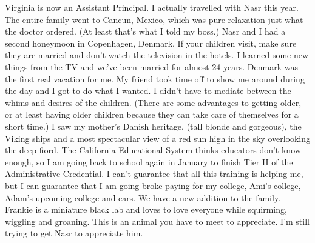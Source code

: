 Virginia is now an Assistant Principal. I actually travelled with Nasr this year. The entire family went to Cancun, Mexico, which was pure
relaxation-just what the doctor ordered.  (At least that's what I told my boss.)  Nasr and I had a second honeymoon in Copenhagen, Denmark.  If
your children visit, make sure they are married and don't watch the television in the hotels.  I learned some new things from the TV and we've
been married for almost 24 years.  Denmark was the first real vacation for me.  My friend took time off to show me around during the day and I
got to do what I wanted.  I didn't have to mediate between the whims and desires of the children.  (There are some advantages to getting older,
or at least having older children because they can take care of themselves for a short time.)  I saw my mother's Danish heritage, (tall blonde
and gorgeous), the Viking ships and a most spectacular view of a red sun high in the sky overlooking the deep fiord.  The California Educational
System thinks educators don't know enough, so I am going back to school again in January to finish Tier II of the Administrative Credential.  I
can't guarantee that all this training is helping me, but I can guarantee that I am going broke paying for my college, Ami's college, Adam's
upcoming college and cars.  We have a new addition to the family.  Frankie is a miniature black lab and loves to love everyone while squirming,
wiggling and groaning.  This is an animal you have to meet to appreciate.  I'm still trying to get Nasr to appreciate him.

